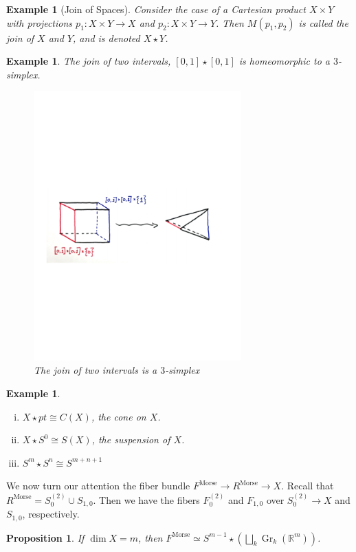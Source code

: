 \documentclass{article}
\newtheorem{proposition}[theorem]{Proposition}
\newtheorem{example}[theorem]{Example}
\newtheorem{proposed work}[theorem]{Proposed Work}
\theoremstyle{definition}
\DeclareMathOperator{\Morse}{Morse}
\DeclareMathOperator{\Gr}{Gr}
\begin{document}
\begin{example}[Join of Spaces]
Consider the case of a Cartesian product $X \times Y$ with projections $p_1: X \times Y \to X$ and $p_2: X \times Y \to Y$. Then $M(p_1, p_2)$ is called the \emph{join} of $X$ and $Y$, and is denoted $X \star Y$. 
\end{example}

\begin{example}
The join of two intervals, $[0,1] \star [0,1]$ is homeomorphic to a $3$-simplex. 
\begin{figure}[h]
\centering
\includegraphics[width=8cm]{joinint}
\caption{The join of two intervals is a $3$-simplex}
\end{figure}
\end{example}

\begin{example}
\begin{enumerate}[(i)]
\item $X \star pt \cong C(X)$, the cone on $X$.
\item $X \star S^0 \cong S(X)$, the suspension of $X$.
\item $S^m \star S^n \cong S^{m+n+1}$
\end{enumerate}
\end{example} 

We now turn our attention the fiber bundle $F^{\Morse} \to R^{\Morse} \to X$. Recall that $R^{\Morse} = S_0^{(2)} \cup S_{1,0}$. Then we have the fibers $F_0^{(2)}$ and $F_{1,0}$ over $S_0^{(2)} \to X$ and $S_{1,0}$, respectively.

\begin{proposition}
If $\dim X = m$, then $F^{\Morse} \simeq S^{m-1} \star \left( \bigsqcup_k \Gr_k(\mathbb{R}^m) \right)$.
\end{proposition}
\end{document}
